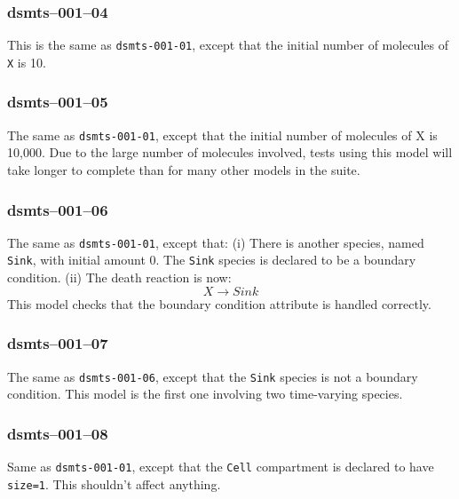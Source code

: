 
\subsubsection{dsmts--001--04}

This is the same as \verb$dsmts-001-01$, except that the initial
number of molecules of \verb$X$ is 10.


\subsubsection{dsmts--001--05}

The same as \verb$dsmts-001-01$, except that the initial number of molecules
of X is 10,000. Due to the large number of molecules involved, tests
using this model will take longer to complete than for many other
models in the suite.


\subsubsection{dsmts--001--06}

The same as \verb$dsmts-001-01$, except that: (i) There is
another species, named \texttt{Sink}, with initial amount 0. The
\verb$Sink$ species 
is declared to be a boundary condition. (ii) The death reaction is
now:
\[
X \longrightarrow Sink 
\]
This model checks that the boundary condition attribute is handled
correctly.


\subsubsection{dsmts--001--07}

The same as \verb$dsmts-001-06$, except that the \texttt{Sink} species is not
a boundary condition. This model is the first one involving two time-varying
species.


\subsubsection{dsmts--001--08}

Same as \verb$dsmts-001-01$, except that the \verb$Cell$
compartment is declared to have \verb$size=1$. This shouldn't affect
anything.

